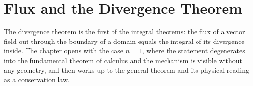 \chapter{Flux and the Divergence Theorem}
\label{ch:flux}

The divergence theorem is the first of the integral theorems: the flux of a vector field out
through the boundary of a domain equals the integral of its divergence inside. The chapter opens
with the case $n=1$, where the statement degenerates into the fundamental theorem of calculus and
the mechanism is visible without any geometry, and then works up to the general theorem and its
physical reading as a conservation law.




